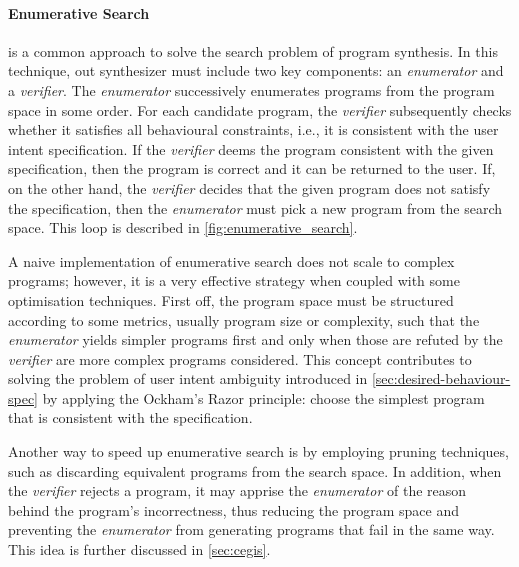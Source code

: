 \paragraph{Enumerative Search}\label{sec:enum-search}
\cite{DBLP:conf/pldi/FengMGDC17,DBLP:conf/pldi/FengMBD18,AlphaRegex16,Orvalho19,DBLP:conf/cav/ReynoldsBNBT19,DBLP:journals/pvldb/OrvalhoTVMM20} is a common approach to solve the search problem of program synthesis. In this technique, out synthesizer must include two key components: an \textit{enumerator} and a \textit{verifier}.
The \textit{enumerator} successively enumerates programs from the program space in some order. For each candidate program, the \textit{verifier} subsequently checks whether it satisfies all behavioural constraints, i.e., it is consistent with the user intent specification.
If the \textit{verifier} deems the program consistent with the given specification, then the program is correct and it can be returned to the user.
If, on the other hand, the \textit{verifier} decides that the given program does not satisfy the specification, then the \textit{enumerator} must pick a new program from the search space.
This loop is described in \autoref{fig:enumerative_search}.

A naive implementation of enumerative search does not scale to complex programs; however, it is a very effective strategy when coupled with some optimisation techniques. First off, the program space must be structured according to some metrics, usually program size or complexity, such that the \textit{enumerator} yields simpler programs first and only when those are refuted by the \textit{verifier} are more complex programs considered. This concept contributes to solving the problem of user intent ambiguity introduced in \autoref{sec:desired-behaviour-spec} by applying the Ockham's Razor principle: choose the simplest program that is consistent with the specification.

Another way to speed up enumerative search is by employing pruning techniques, such as discarding equivalent programs from the search space.
In addition, when the \textit{verifier} rejects a program, it may apprise the \textit{enumerator} of the reason behind the program's incorrectness, thus reducing the program space and preventing the \textit{enumerator} from generating programs that fail in the same way.
This idea is further discussed in \autoref{sec:cegis}.


